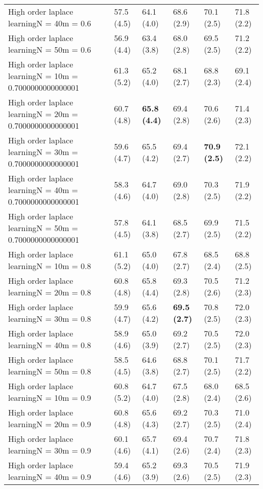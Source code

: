 \documentclass{article}
\begin{document}
\begin{table*}[t!]
\begin{center}
\begin{small}
\begin{sc}
\begin{tabular}{llllll}
High order laplace learningN = 40m = 0.6&57.5 (4.5)      &64.1 (4.0)      &68.6 (2.9)      &70.1 (2.5)      &71.8 (2.2)      \\
High order laplace learningN = 50m = 0.6&56.9 (4.4)      &63.4 (3.8)      &68.0 (2.8)      &69.5 (2.5)      &71.2 (2.2)      \\
High order laplace learningN = 10m = 0.7000000000000001&61.3 (5.2)      &65.2 (4.0)      &68.1 (2.7)      &68.8 (2.3)      &69.1 (2.4)      \\
High order laplace learningN = 20m = 0.7000000000000001&60.7 (4.8)      &{\bf 65.8 (4.4)}&69.4 (2.8)      &70.6 (2.6)      &71.4 (2.3)      \\
High order laplace learningN = 30m = 0.7000000000000001&59.6 (4.7)      &65.5 (4.2)      &69.4 (2.7)      &{\bf 70.9 (2.5)}&72.1 (2.2)      \\
High order laplace learningN = 40m = 0.7000000000000001&58.3 (4.6)      &64.7 (4.0)      &69.0 (2.8)      &70.3 (2.5)      &71.9 (2.2)      \\
High order laplace learningN = 50m = 0.7000000000000001&57.8 (4.5)      &64.1 (3.8)      &68.5 (2.7)      &69.9 (2.5)      &71.5 (2.2)      \\
High order laplace learningN = 10m = 0.8&61.1 (5.2)      &65.0 (4.0)      &67.8 (2.7)      &68.5 (2.4)      &68.8 (2.5)      \\
High order laplace learningN = 20m = 0.8&60.8 (4.8)      &65.8 (4.4)      &69.3 (2.8)      &70.5 (2.6)      &71.2 (2.3)      \\
High order laplace learningN = 30m = 0.8&59.9 (4.7)      &65.6 (4.2)      &{\bf 69.5 (2.7)}&70.8 (2.5)      &72.0 (2.3)      \\
High order laplace learningN = 40m = 0.8&58.9 (4.6)      &65.0 (3.9)      &69.2 (2.7)      &70.5 (2.5)      &72.0 (2.3)      \\
High order laplace learningN = 50m = 0.8&58.5 (4.5)      &64.6 (3.8)      &68.8 (2.7)      &70.1 (2.5)      &71.7 (2.2)      \\
High order laplace learningN = 10m = 0.9&60.8 (5.2)      &64.7 (4.0)      &67.5 (2.8)      &68.0 (2.4)      &68.5 (2.6)      \\
High order laplace learningN = 20m = 0.9&60.8 (4.8)      &65.6 (4.3)      &69.2 (2.7)      &70.3 (2.5)      &71.0 (2.4)      \\
High order laplace learningN = 30m = 0.9&60.1 (4.6)      &65.7 (4.1)      &69.4 (2.6)      &70.7 (2.4)      &71.8 (2.3)      \\
High order laplace learningN = 40m = 0.9&59.4 (4.6)      &65.2 (3.9)      &69.3 (2.6)      &70.5 (2.5)      &71.9 (2.3)      \\

\end{tabular}
\end{sc}
\end{small}
\end{center}
\end{table*}
\end{document}
